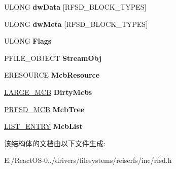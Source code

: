 \begin{DoxyCompactItemize}
U\+L\+O\+NG {\bfseries dw\+Data} \mbox{[}R\+F\+S\+D\+\_\+\+B\+L\+O\+C\+K\+\_\+\+T\+Y\+P\+ES\mbox{]}
\item 
\mbox{\label{struct___r_f_s_d___v_c_b_a459de5aa84b9d8234ceb509deaa45aae}} 
U\+L\+O\+NG {\bfseries dw\+Meta} \mbox{[}R\+F\+S\+D\+\_\+\+B\+L\+O\+C\+K\+\_\+\+T\+Y\+P\+ES\mbox{]}
\item 
\mbox{\label{struct___r_f_s_d___v_c_b_a315d375f971b978444cc04d68acbcf48}} 
U\+L\+O\+NG {\bfseries Flags}
\item 
\mbox{\label{struct___r_f_s_d___v_c_b_afbed17ce1fc03793c8b9201b0c77be0f}} 
P\+F\+I\+L\+E\+\_\+\+O\+B\+J\+E\+CT {\bfseries Stream\+Obj}
\item 
\mbox{\label{struct___r_f_s_d___v_c_b_a4a8d8a1043e0089f1df647b52c768253}} 
E\+R\+E\+S\+O\+U\+R\+CE {\bfseries Mcb\+Resource}
\item 
\mbox{\label{struct___r_f_s_d___v_c_b_a525e6662c72f9e819d9fe20f04724c78}} 
\hyperlink{struct___l_a_r_g_e___m_c_b}{L\+A\+R\+G\+E\+\_\+\+M\+CB} {\bfseries Dirty\+Mcbs}
\item 
\mbox{\label{struct___r_f_s_d___v_c_b_a23fc9b6e89c59be1f31ab7748683d2b5}} 
\hyperlink{struct___r_f_s_d___m_c_b}{P\+R\+F\+S\+D\+\_\+\+M\+CB} {\bfseries Mcb\+Tree}
\item 
\mbox{\label{struct___r_f_s_d___v_c_b_a8b6e818cbdc5cff9de83259bb86682fd}} 
\hyperlink{struct___l_i_s_t___e_n_t_r_y}{L\+I\+S\+T\+\_\+\+E\+N\+T\+RY} {\bfseries Mcb\+List}
\end{DoxyCompactItemize}


该结构体的文档由以下文件生成\+:\begin{DoxyCompactItemize}
\item 
E\+:/\+React\+O\+S-\/0../drivers/filesystems/reiserfs/inc/rfsd.\+h\end{DoxyCompactItemize}
